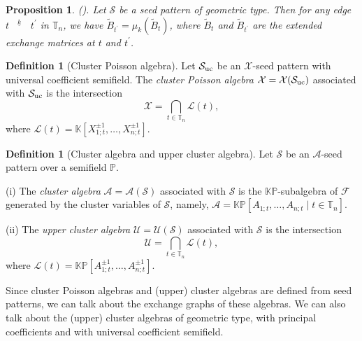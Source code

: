 \documentclass{amsart}
\newtheorem{proposition}[theorem]{Proposition}
\theoremstyle{definition}
\newtheorem{definition}[theorem]{Definition}
\theoremstyle{remark}
\numberwithin{equation}{section}
\begin{document}
\begin{proposition}
{\rm (}\cite[Proposition 5.8]{FZ}{\rm ).}
Let $\mathcal S$ be a seed pattern  of geometric type. Then for any edge $t^{~\underline{\quad k \quad}}~ t^{\prime}$ in $\mathbb T_n$, we have $\widetilde B_{t^\prime}=\mu_k(\widetilde B_t)$, where $\widetilde B_t$ and $\widetilde B_{t^\prime}$ are the extended exchange matrices at $t$ and $t^\prime$.
\end{proposition}


\begin{definition}[Cluster Poisson algebra] \label{defcpa}
Let $\mathcal S_{\rm uc}$ be an $\mathscr X$-seed pattern with universal coefficient semifield.  The {\em cluster Poisson algebra} $\mathcal X=\mathcal X(\mathcal S_{\rm uc})$ associated with $\mathcal S_{\rm uc}$ is the intersection
$$\mathcal X=\bigcap\limits_{t\in\mathbb T_n} {\mathcal L}(t),$$
where ${\mathcal L}(t)=\mathbb {K}[X_{1;t}^{\pm1},\ldots,X_{n;t}^{\pm1}]$.
\end{definition}

\begin{definition}[Cluster algebra and upper cluster algebra]
Let $\mathcal S$ be an $\mathscr A$-seed pattern over a semifield $\mathbb P$.

(i) The {\em cluster algebra} $\mathcal A=\mathcal A(\mathcal S)$ associated with $\mathcal S$ is the $\mathbb {KP}$-subalgebra of $\mathcal F$ generated by the cluster variables of $\mathcal S$, namely, $\mathcal A=\mathbb{KP}[A_{1;t},\ldots,A_{n;t}\mid t\in\mathbb T_n]$.

(ii) The {\em upper cluster algebra} $\mathcal U=\mathcal U(\mathcal S)$ associated with $\mathcal S$ is the intersection
$$\mathcal U=\bigcap\limits_{t\in\mathbb T_n} {\mathcal L}(t),$$
where ${\mathcal L}(t)=\mathbb {KP}[A_{1;t}^{\pm1},\ldots,A_{n;t}^{\pm1}]$.
\end{definition}

Since cluster Poisson algebras and (upper) cluster algebras are defined from seed patterns, we can talk about the exchange graphs of these algebras. We can also talk about the (upper) cluster algebras of geometric type, with principal coefficients and with universal coefficient semifield. 
\end{document}
